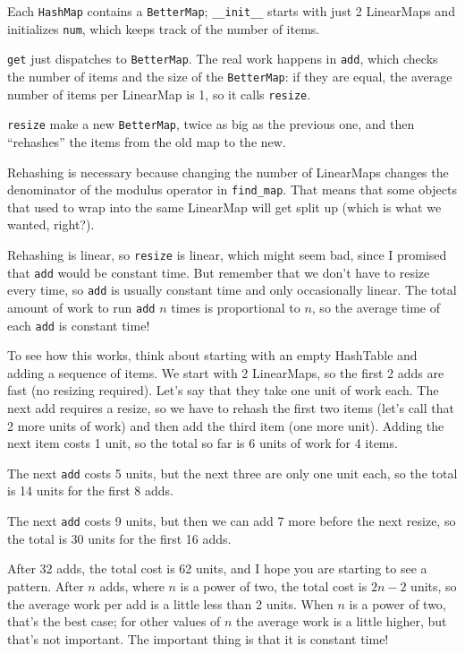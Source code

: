 \documentclass[10pt]{book}
\begin{document}
Each {\tt HashMap} contains a {\tt BetterMap}; \verb"__init__" starts
with just 2 LinearMaps and initializes {\tt num}, which keeps track of
the number of items.

{\tt get} just dispatches to {\tt BetterMap}.  The real work happens
in {\tt add}, which checks the number of items and the size of the
{\tt BetterMap}:
if they are equal, the average number of items per LinearMap
is 1, so it calls {\tt resize}.

{\tt resize} make a new {\tt BetterMap}, twice as big as the previous
one, and then ``rehashes'' the items from the old map to the new.

Rehashing is necessary because changing the number of LinearMaps
changes the denominator of the modulus operator in
\verb"find_map".  That means that some objects that used
to wrap into the same LinearMap will get split up (which is
what we wanted, right?).

Rehashing is linear, so 
{\tt resize} is linear, which might seem bad, since I promised
that {\tt add} would be constant time.  But remember that
we don't have to resize every time, so {\tt add} is usually
constant time and only occasionally linear.  The total amount
of work to run {\tt add} $n$ times is proportional to $n$,
so the average time of each {\tt add} is constant time!

To see how this works, think about starting with an empty
HashTable and adding a sequence of items.  We start with 2 LinearMaps,
so the first 2 adds are fast (no resizing required).  Let's
say that they take one unit of work each.  The next add
requires a resize, so we have to rehash the first two
items (let's call that 2 more units of work) and then
add the third item (one more unit).  Adding the next item
costs 1 unit, so the total so far is
6 units of work for 4 items.

The next {\tt add} costs 5 units, but the next three
are only one unit each, so the total is 14 units for the
first 8 adds.

The next {\tt add} costs 9 units, but then we can add 7 more
before the next resize, so the total is 30 units for the
first 16 adds.

After 32 adds, the total cost is 62 units, and I hope you are starting
to see a pattern.  After $n$ adds, where $n$ is a power of two, the
total cost is $2n - 2$ units, so the average work per add is
a little less than 2 units.  When $n$ is a power of two, that's
the best case; for other values of $n$ the average work is a little
higher, but that's not important.  The important thing is that it
is constant time!
\end{document}
